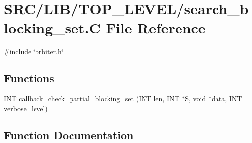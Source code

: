 \hypertarget{search__blocking__set_8_c}{}\section{S\+R\+C/\+L\+I\+B/\+T\+O\+P\+\_\+\+L\+E\+V\+E\+L/search\+\_\+blocking\+\_\+set.C File Reference}
\label{search__blocking__set_8_c}
{\ttfamily \#include \char`\"{}orbiter.\+h\char`\"{}}\newline
\subsection*{Functions}
\begin{DoxyCompactItemize}
\item 
\mbox{\hyperlink{galois_8h_a09fddde158a3a20bd2dcadb609de11dc}{I\+NT}} \mbox{\hyperlink{search__blocking__set_8_c_a75b6c1cd4f88a79989267297a15820f8}{callback\+\_\+check\+\_\+partial\+\_\+blocking\+\_\+set}} (\mbox{\hyperlink{galois_8h_a09fddde158a3a20bd2dcadb609de11dc}{I\+NT}} len, \mbox{\hyperlink{galois_8h_a09fddde158a3a20bd2dcadb609de11dc}{I\+NT}} $\ast$\mbox{\hyperlink{simeon_8_c_adab47f8243f1b5a2c31df2535d6b37d0}{S}}, void $\ast$data, \mbox{\hyperlink{galois_8h_a09fddde158a3a20bd2dcadb609de11dc}{I\+NT}} \mbox{\hyperlink{simeon_8_c_a818073fbcc2f439e7c56952f67386122}{verbose\+\_\+level}})
\end{DoxyCompactItemize}


\subsection{Function Documentation}
\mbox{\label{search__blocking__set_8_c_a75b6c1cd4f88a79989267297a15820f8}} 
